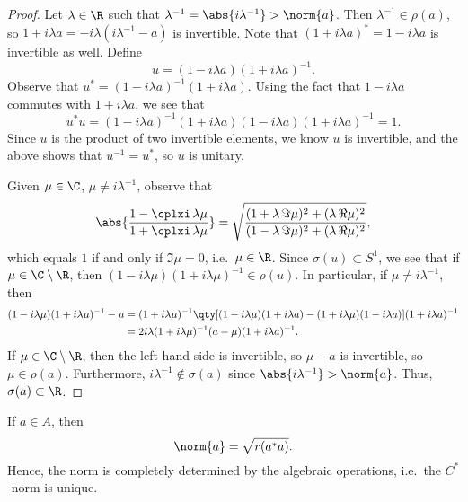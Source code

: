\begin{proof}
Let $\lambda \in \R$ such that $\lambda^{-1} = \abs{i\lambda^{-1}} > \norm{a}$. Then $\lambda^{-1} \in \rho(a)$, so $1 + i\lambda a = -i\lambda(i\lambda^{-1}  - a)$ is invertible. Note that $(1 + i\lambda a)^* = 1 - i \lambda a$ is invertible as well. Define
\begin{equation}
u = (1 - i\lambda a)(1 + i \lambda a)^{-1}.
\end{equation}
Observe that $u^* = (1 - i\lambda a)^{-1}(1 + i \lambda a)$. Using the fact that $1 - i \lambda a$ commutes with $1 + i \lambda a$, we see that
\begin{equation}
u^*u = (1- i\lambda a)^{-1} (1 + i \lambda a)(1 - i \lambda a) (1 + i \lambda a)^{-1} = 1.
\end{equation}
Since $u$ is the product of two invertible elements, we know $u$ is invertible, and the above shows that $u^{-1} = u^*$, so $u$ is unitary.

Given $\mu \in \C$, $\mu \neq i\lambda^{-1}$, observe that
\begin{equation}
\abs{\frac{1 - \cplxi \, \lambda \mu}{1 + \cplxi \, \lambda \mu}} = \sqrt{\frac{(1 + \lambda \, \Im \mu)^2 + (\lambda \, \Re \mu)^2}{(1 - \lambda \, \Im \mu)^2 + (\lambda \, \Re \mu)^2}},
\end{equation}
which equals $1$ if and only if $\Im \mu = 0$, i.e.\ $\mu \in \R$. Since $\sigma(u) \subset S^1$, we see that if $\mu \in \C \setminus \R$, then $(1-i \lambda \mu)(1 + i \lambda \mu)^{-1} \in \rho(u)$. In particular, if $\mu \neq i \lambda^{-1}$, then 
\begin{equation}
\begin{aligned}
(1 - i \lambda \mu)(1 + i \lambda \mu)^{-1} - u &= (1 + i \lambda \mu)^{-1}\qty[(1 - i \lambda \mu)(1 + i \lambda a) - (1 + i \lambda \mu)(1 - i\lambda a)](1 + i \lambda a)^{-1}\\
&= 2i\lambda(1 + i \lambda \mu)^{-1} (a - \mu)(1 + i \lambda a)^{-1}.
\end{aligned}
\end{equation}
If $\mu \in \C \setminus \R$, then the left hand side is invertible, so $\mu - a$ is invertible, so $\mu \in \rho(a)$. Furthermore, $i\lambda^{-1} \notin \sigma(a)$ since $\abs{i\lambda^{-1}} > \norm{a}$. Thus, $\sigma(a) \subset \R$. 
\end{proof}

\begin{corollary}\label{cor:unique_star_norm}
If $a \in A$, then
\begin{equation}
\norm{a} = \sqrt{r(a^*a)}.
\end{equation}
Hence, the norm is completely determined by the algebraic operations, i.e.\ the $C^*$-norm is unique.
\end{corollary}

